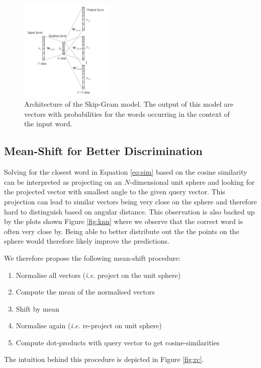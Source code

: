 \documentclass[conference]{IEEEtran}
\begin{document}
\begin{figure}[t]
\centering
\includegraphics[width=0.4\textwidth]{skip-gram}
\caption{Architecture of the Skip-Gram model. The output of this model are vectors with probabilities 
for the words occurring in the context of the input word.}
\label{fig:skip}
\end{figure}

\subsection{Mean-Shift for Better Discrimination}
Solving for the closest word in Equation \ref{eq:sim} based on the cosine similarity can be interpreted as projecting on an $N$-dimensional unit sphere and looking for the projected vector with smallest  angle to the given query vector. This projection can lead to similar vectors being very close on the sphere and therefore hard to distinguish based on angular distance. This observation is also backed up by the plots shown Figure \ref{fig:knn} where we observe that the correct word is often very close by. Being able to better distribute out the the points on the sphere would therefore likely improve the predictions. 

We therefore propose the following mean-shift procedure:
\begin{enumerate}
\item Normalise all vectors (\textit{i.e.} project on the unit sphere)
\item Compute the mean of the normalised vectors
\item Shift by mean
\item Normalise again (\textit{i.e.} re-project on unit sphere)
\item Compute dot-products with query vector to get cosine-similarities
\end{enumerate}

The intuition behind this procedure is depicted in Figure \ref{fig:rc}.
\end{document}
